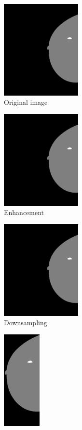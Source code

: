 \begin{figure}[h]
\begin{subfigure}{2.4 cm}
        \end{subfigure}
	\\
	\begin{subfigure}{4.2 cm}
		\centering
                \includegraphics[height = 5cm]{plots/label.png}
		\caption{Original image}
		\label{subfig:Preprocessinga}
        \end{subfigure}
	\begin{subfigure}{4.2 cm}
		\centering
                \includegraphics[height = 5cm]{plots/label_enhanced.png}
		\caption{Enhancement}
		\label{subfig:Preprocessingb}
        \end{subfigure}
	\begin{subfigure}{4.2 cm}
		\centering
                \includegraphics[height = 5cm]{plots/label_resized.png}
		\caption{Downsampling}
		\label{subfig:Preprocessingc}
        \end{subfigure}
	\begin{subfigure}{2.4 cm}
		\centering
		\includegraphics[height = 5cm]{plots/label_v1.png}

\end{subfigure}
\end{figure}
